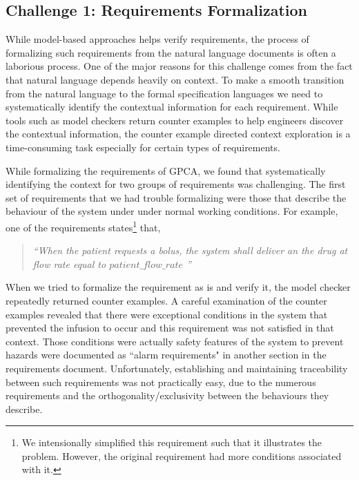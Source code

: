 \subsection{Challenge 1: Requirements Formalization}

While model-based approaches helps verify requirements, the process of formalizing such requirements from the natural language documents is often a laborious process. One of the major reasons for this challenge comes from the fact that natural language depends heavily on context. To make a smooth transition from the natural language to the formal specification languages we need to systematically identify the contextual information for each requirement. While tools such as model checkers return counter examples to help engineers discover the contextual information, the counter example directed context exploration is a time-consuming task especially for certain types of requirements. 

While formalizing the requirements of GPCA, we found that systematically identifying the context for two groups of requirements was challenging. The first set of requirements that we had trouble formalizing were those that describe the behaviour of the system under under normal working conditions. For example, one of the requirements states\footnote{\scriptsize{We intensionally simplified this requirement such that it illustrates the problem. However, the original requirement had more conditions associated with it.}} that,

\begin{quotation}
\emph{``When the patient requests a bolus, the system shall deliver an the drug at flow rate equal to $patient\_flow\_rate$ ''}
\end{quotation}

When we tried to formalize the requirement as is and verify it, the model checker repeatedly returned counter examples. A careful examination of the counter examples revealed that there were exceptional conditions in the system that prevented the infusion to occur and this requirement was not satisfied in that context. Those conditions were actually safety features of the system to prevent hazards were documented as ``alarm requirements" in another section in the requirements document. Unfortunately, establishing and maintaining traceability between such requirements was not practically easy, due to the numerous requirements and the orthogonality/exclusivity between the behaviours they describe.

